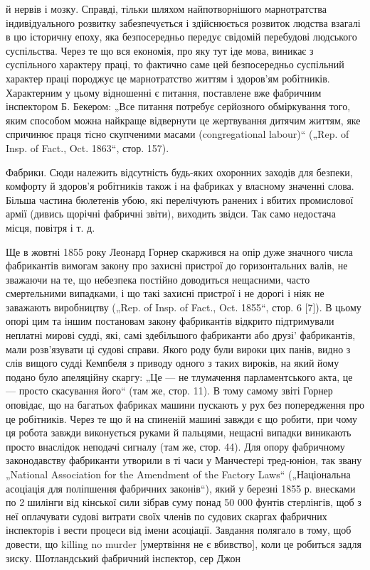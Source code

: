 й нервів і мозку. Справді, тільки шляхом найпотворнішого марнотратства індивідуального розвитку
забезпечується і здійснюється
розвиток людства взагалі в цю історичну епоху, яка безпосередньо передує свідомій перебудові
людського суспільства. Через те що вся економія, про яку тут іде мова, виникає з суспільного
характеру праці, то фактично саме цей безпосередньо
суспільний характер праці породжує це марнотратство життям і
здоров’ям робітників. Характерним у цьому відношенні є питання,
поставлене вже фабричним інспектором Б. Бекером: „Все питання потребує серйозного обміркування того,
яким способом
можна найкраще відвернути це жертвування дитячим життям,
яке спричинює праця тісно скупченими масами (congregational
labour)“ („Rep. of Insp. of Fact., Oct. 1863“, стор. 157).

Фабрики. Сюди належить відсутність будь-яких охоронних
заходів для безпеки, комфорту й здоров’я робітників також і на
фабриках у власному значенні слова. Більша частина бюлетенів
убою, які перелічують ранених і вбитих промислової армії (дивись щорічні фабричні звіти), виходить
звідси. Так само недостача місця, повітря і т. д.

Ще в жовтні 1855 року Леонард Горнер скаржився на опір
дуже значного числа фабрикантів вимогам закону про захисні
пристрої до горизонтальних валів, не зважаючи на те, що небезпека постійно доводиться нещасними,
часто смертельними
випадками, і що такі захисні пристрої і не дорогі і ніяк не заважають виробництву („Rep. of Insp. of
Fact., Oct. 1855“, стор. 6 [7]).
В цьому опорі цим та іншим постановам закону фабрикантів
відкрито підтримували неплатні мирові судді, які, самі здебільшого фабриканти або друзі'
фабрикантів, мали розв’язувати ці судові справи. Якого роду були вироки цих панів,
видно з слів вищого судді Кемпбеля з приводу одного з таких
вироків, на який йому подано було апеляційну скаргу: „Це —
не тлумачення парламентського акта, це — просто скасування
його“ (там же, стор. 11). В тому самому звіті Горнер оповідає, що на багатьох фабриках машини
пускають у рух без
попередження про це робітників. Через те що й на спиненій
машині завжди є що робити, при чому ця робота завжди виконується руками й пальцями, нещасні випадки
виникають просто
внаслідок неподачі сигналу (там же, стор. 44). Для опору
фабричному законодавству фабриканти утворили в ті часи
у Манчестері тред-юніон, так звану „National Association for the
Amendment of the Factory Laws“ („Національна асоціація для поліпшення фабричних законів“), який у
березні 1855 р. внесками
по 2 шилінги від кінської сили зібрав суму понад 50 000 фунтів
стерлінгів, щоб з неї оплачувати судові витрати своїх членів
по судових скаргах фабричних інспекторів і вести процеси від
імени асоціації. Завдання полягало в тому, щоб довести, що killing no murder [умертвіння не є
вбивство], коли це робиться
задля зиску. Шотландський фабричний інспектор, сер Джон
